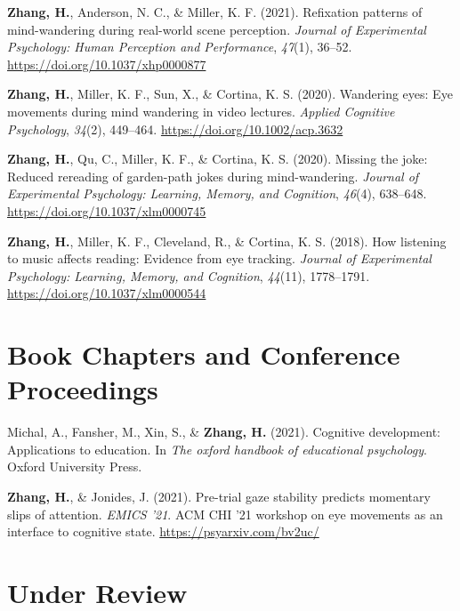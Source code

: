 \documentclass[11pt,a4paper,]{awesome-cv}
\begin{document}
\leavevmode{}%
\textbf{Zhang, H.}, Anderson, N. C., \& Miller, K. F. (2021). Refixation
patterns of mind-wandering during real-world scene perception.
\emph{Journal of Experimental Psychology: Human Perception and
Performance}, \emph{47}(1), 36--52.
\url{https://doi.org/10.1037/xhp0000877}

\leavevmode{}%
\textbf{Zhang, H.}, Miller, K. F., Sun, X., \& Cortina, K. S. (2020).
Wandering eyes: Eye movements during mind wandering in video lectures.
\emph{Applied Cognitive Psychology}, \emph{34}(2), 449--464.
\url{https://doi.org/10.1002/acp.3632}

\leavevmode{}%
\textbf{Zhang, H.}, Qu, C., Miller, K. F., \& Cortina, K. S. (2020).
Missing the joke: Reduced rereading of garden-path jokes during
mind-wandering. \emph{Journal of Experimental Psychology: Learning,
Memory, and Cognition}, \emph{46}(4), 638--648.
\url{https://doi.org/10.1037/xlm0000745}

\leavevmode{}%
\textbf{Zhang, H.}, Miller, K. F., Cleveland, R., \& Cortina, K. S.
(2018). How listening to music affects reading: Evidence from eye
tracking. \emph{Journal of Experimental Psychology: Learning, Memory,
and Cognition}, \emph{44}(11), 1778--1791.
\url{https://doi.org/10.1037/xlm0000544}

\hypertarget{book-chapters-and-conference-proceedings}{%
\section{Book Chapters and Conference
Proceedings}\label{book-chapters-and-conference-proceedings}}

\hypertarget{bibliography}{}
\leavevmode{}%
Michal, A., Fansher, M., Xin, S., \& \textbf{Zhang, H.} (2021).
Cognitive development: Applications to education. In \emph{The oxford
handbook of educational psychology}. Oxford University Press.

\leavevmode{}%
\textbf{Zhang, H.}, \& Jonides, J. (2021). Pre-trial gaze stability
predicts momentary slips of attention. \emph{EMICS '21}. ACM CHI '21
workshop on eye movements as an interface to cognitive state.
\url{https://psyarxiv.com/bv2uc/}

\hypertarget{under-review}{%
\section{Under Review}\label{under-review}}
\end{document}
